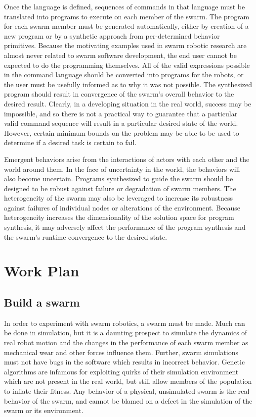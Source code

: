 \documentclass[]{article}
\begin{document}
Once the language is defined, sequences of commands in that language must be translated into programs to execute on each member of the swarm. 
The program for each swarm member must be generated automatically, either by creation of a new program or by a synthetic approach from per-determined behavior primitives.
Because the motivating examples used in swarm robotic research are almost never related to swarm software development, the end user cannot be expected to do the programming themselves. 
All of the valid expressions possible in the command language should be converted into programs for the robots, or the user must be usefully informed as to why it was not possible. 
The synthesized program should result in convergence of the swarm's overall behavior to the desired result. 
Clearly, in a developing situation in the real world, success may be impossible, and so there is not a practical way to guarantee that a particular valid command sequence will result in a particular desired state of the world. 
However, certain minimum bounds on the problem may be able to be used to determine if a desired task is certain to fail.

Emergent behaviors arise from the interactions of actors with each other and the world around them. 
In the face of uncertainty in the world, the behaviors will also become uncertain. 
Programs synthesized to guide the swarm should be designed to be robust against failure or degradation of swarm members. 
The heterogeneity of the swarm may also be leveraged to increase its robustness against failures of individual nodes or alterations of the environment. 
Because heterogeneity increases the dimensionality of the solution space for program synthesis, it may adversely affect the performance of the program synthesis and the swarm's runtime convergence to the desired state.

\section{Work Plan}

\subsection{Build a swarm}

In order to experiment with swarm robotics, a swarm must be made.
Much can be done in simulation, but it is a daunting prospect to simulate the dynamics of real robot motion and the changes in the performance of each swarm member as mechanical wear and other forces influence them. 
Further, swarm simulations must not have bugs in the software which results in incorrect behavior. 
Genetic algorithms are infamous for exploiting quirks of their simulation environment which are not present in the real world, but still allow members of the population to inflate their fitness. 
Any behavior of a physical, unsimulated swarm is the real behavior of the swarm, and cannot be blamed on a defect in the simulation of the swarm or its environment. 
\end{document}
